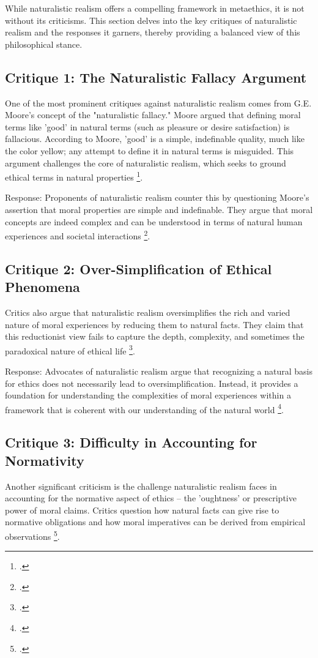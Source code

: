 \documentclass[12pt,a4paper]{article}
\begin{document}
While naturalistic realism offers a compelling framework in metaethics, it is not without its criticisms. This section delves into the key critiques of naturalistic realism and the responses it garners, thereby providing a balanced view of this philosophical stance.

\subsection{Critique 1: The Naturalistic Fallacy Argument}
One of the most prominent critiques against naturalistic realism comes from G.E. Moore's concept of the "naturalistic fallacy." Moore argued that defining moral terms like 'good' in natural terms (such as pleasure or desire satisfaction) is fallacious. According to Moore, 'good' is a simple, indefinable quality, much like the color yellow; any attempt to define it in natural terms is misguided. This argument challenges the core of naturalistic realism, which seeks to ground ethical terms in natural properties \footcite[291-311]{Baldwin2006}.

Response: Proponents of naturalistic realism counter this by questioning Moore's assertion that moral properties are simple and indefinable. They argue that moral concepts are indeed complex and can be understood in terms of natural human experiences and societal interactions \footcite[532-547]{Dreier2018}.

\subsection{Critique 2: Over-Simplification of Ethical Phenomena}
Critics also argue that naturalistic realism oversimplifies the rich and varied nature of moral experiences by reducing them to natural facts. They claim that this reductionist view fails to capture the depth, complexity, and sometimes the paradoxical nature of ethical life \footcite[843-851]{Joyce2014}.

Response: Advocates of naturalistic realism argue that recognizing a natural basis for ethics does not necessarily lead to oversimplification. Instead, it provides a foundation for understanding the complexities of moral experiences within a framework that is coherent with our understanding of the natural world \footcite[610-624]{Copp1991}.

\subsection{Critique 3: Difficulty in Accounting for Normativity}
Another significant criticism is the challenge naturalistic realism faces in accounting for the normative aspect of ethics – the 'oughtness' or prescriptive power of moral claims. Critics question how natural facts can give rise to normative obligations and how moral imperatives can be derived from empirical observations \footcite{McPherson2012}.
\end{document}
